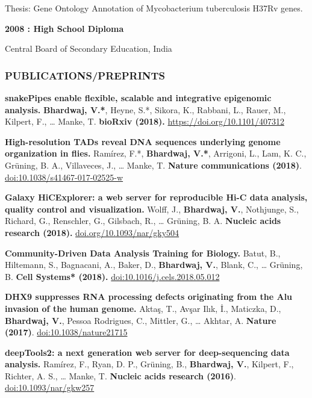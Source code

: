 \documentclass[11pt,twoside]{MPIthesis}
\theoremstyle{definition}
\theoremstyle{definition}
\theoremstyle{definition}
\theoremstyle{remark}
\begin{document}
Thesis: Gene Ontology Annotation of Mycobacterium tuberculosis H37Rv
genes.

\textbf{2008 : High School Diploma}

Central Board of Secondary Education, India

\subsubsection{PUBLICATIONS/PREPRINTS}\label{publicationspreprints}

\textbf{snakePipes enable flexible, scalable and integrative epigenomic
analysis.} \textbf{Bhardwaj, V.*}, Heyne, S.*, Sikora, K., Rabbani, L.,
Rauer, M., Kilpert, F., \ldots{} Manke, T. \textbf{bioRxiv (2018).}
\href{https://doi.org/10.1101/407312}{{https://doi.org/10.1101/407312}}

\textbf{High-resolution TADs reveal DNA sequences underlying genome
organization in flies.} Ramírez, F.*, \textbf{Bhardwaj, V.*}, Arrigoni,
L., Lam, K. C., Grüning, B. A., Villaveces, J., \ldots{} Manke, T.
\textbf{Nature communications (2018)}.
\href{https://www.nature.com/articles/s41467-017-02525-w}{{doi:10.1038/s41467-017-02525-w}}

\textbf{Galaxy HiCExplorer: a web server for reproducible Hi-C data
analysis, quality control and visualization.} Wolff, J.,
\textbf{Bhardwaj, V.}, Nothjunge, S., Richard, G., Renschler, G.,
Gilsbach, R., \ldots{} Grüning, B. A. \textbf{Nucleic acids research
(2018).}
\href{http://doi.org/10.1093/nar/gky504}{{doi.org/10.1093/nar/gky504}}

\textbf{Community-Driven Data Analysis Training for Biology.} Batut, B.,
Hiltemann, S., Bagnacani, A., Baker, D., \textbf{Bhardwaj, V.}, Blank,
C., \ldots{} Grüning, B. \textbf{Cell Systems* (2018).}
\href{https://doi.org/10.1016/j.cels.2018.05.012}{{doi:10.1016/j.cels.2018.05.012}}

\textbf{DHX9 suppresses RNA processing defects originating from the Alu
invasion of the human genome.} Aktaş, T., Avşar Ilık, İ., Maticzka, D.,
\textbf{Bhardwaj, V.}, Pessoa Rodrigues, C., Mittler, G., \ldots{}
Akhtar, A. \textbf{Nature (2017)}.
\href{https://www.nature.com/articles/nature21715}{{doi:10.1038/nature21715}}

\textbf{deepTools2: a next generation web server for deep-sequencing
data analysis.} Ramírez, F., Ryan, D. P., Grüning, B., \textbf{Bhardwaj,
V.}, Kilpert, F., Richter, A. S., \ldots{} Manke, T. \textbf{Nucleic
acids research (2016)}.
\href{http://dx.doi.org/10.1093/nar/gku365}{{doi:10.1093/nar/gkw257}}
\end{document}
